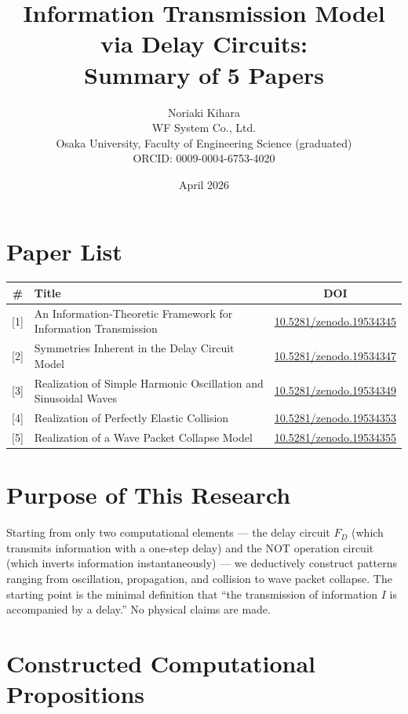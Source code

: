 \documentclass[12pt,a4paper]{article}
\title{Information Transmission Model via Delay Circuits:\\Summary of 5 Papers}
\author{Noriaki Kihara\\
WF System Co., Ltd.\\
Osaka University, Faculty of Engineering Science (graduated)\\
ORCID: 0009-0004-6753-4020}
\date{April 2026}
\begin{document}
\maketitle

\section*{Paper List}

\begin{table}[h]
\centering
\begin{tabular}{clc}
\toprule
\# & Title & DOI \\
\midrule
{[1]} & An Information-Theoretic Framework for Information Transmission & \href{https://doi.org/10.5281/zenodo.19534345}{10.5281/zenodo.19534345} \\
{[2]} & Symmetries Inherent in the Delay Circuit Model & \href{https://doi.org/10.5281/zenodo.19534347}{10.5281/zenodo.19534347} \\
{[3]} & Realization of Simple Harmonic Oscillation and Sinusoidal Waves & \href{https://doi.org/10.5281/zenodo.19534349}{10.5281/zenodo.19534349} \\
{[4]} & Realization of Perfectly Elastic Collision & \href{https://doi.org/10.5281/zenodo.19534353}{10.5281/zenodo.19534353} \\
{[5]} & Realization of a Wave Packet Collapse Model & \href{https://doi.org/10.5281/zenodo.19534355}{10.5281/zenodo.19534355} \\
\bottomrule
\end{tabular}
\end{table}

\section*{Purpose of This Research}

Starting from only two computational elements --- the delay circuit $F_D$ (which transmits information with a one-step delay) and the NOT operation circuit (which inverts information instantaneously) --- we deductively construct patterns ranging from oscillation, propagation, and collision to wave packet collapse. The starting point is the minimal definition that ``the transmission of information $I$ is accompanied by a delay.'' No physical claims are made.

\section*{Constructed Computational Propositions}
\end{document}
